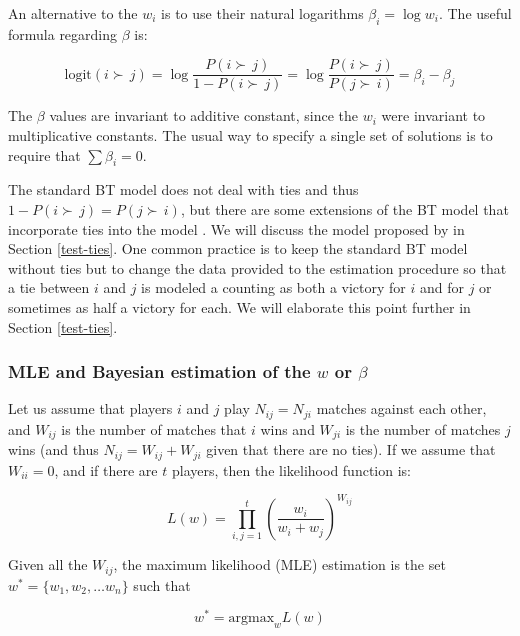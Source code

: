 \documentclass[twoside,11pt,preprint]{article}
\begin{document}
An alternative to the \(w_i\) is to use their natural logarithms \(\beta_i = \log w_i\).
The useful formula regarding \(\beta\) is:

\begin{equation*}
\mbox{logit}(i \succ\,j) = \log \frac{P(i \succ\,j)}{1-P(i \succ\,j)} = \log \frac{P(i \succ\,j)}{P(j \succ\,i)} = \beta_i - \beta_j 
\end{equation*}

The \(\beta\) values are invariant to additive constant, since the \(w_i\)
were invariant to multiplicative constants. The usual way to specify a
single set of solutions is to require that \(\sum \beta_i = 0\).

The standard BT model does not deal with ties and thus \(1 - P(i \succ\,j) = P(j \succ\,i)\), but there are some extensions of the BT
model that incorporate ties into the model \citep{rao1967ties, davidson1970extending, baker2021modifying}. We will discuss the model proposed by \citet{davidson1970extending} in Section \ref{test-ties}. One common practice
is to keep the standard BT model without ties but to change the data
provided to the estimation procedure so that a tie between \(i\) and \(j\)
is modeled a counting as both a victory for \(i\) and for \(j\) or sometimes
as half a victory for each. We will elaborate this point further
in Section \ref{test-ties}.

\hypertarget{mle-and-bayesian-estimation-of-the-w-or-beta}{%
\subsubsection{\texorpdfstring{MLE and Bayesian estimation of the \(w\) or \(\beta\) \label{sec:bayesbt}}{MLE and Bayesian estimation of the w or \textbackslash beta }}\label{mle-and-bayesian-estimation-of-the-w-or-beta}}

Let us assume that players \(i\) and \(j\) play \(N_{ij}= N_{ji}\) matches against each other,
and \(W_{ij}\) is the number of matches that \(i\) wins and \(W_{ji}\) is
the number of matches \(j\) wins (and thus \(N_{ij} = W_{ij} + W_{ji}\)
given that there are no ties). If we assume that \(W_{ii} = 0\), and if
there are \(t\) players, then the likelihood function is:

\[L(w) = \prod_{i,j=1}^t (\frac{w_i}{w_i+w_j } )^{W_{ij} }\]

Given all the \(W_{ij}\), the maximum likelihood (MLE) estimation is the set \(w^* = \{w_1, w_2, \ldots w_n \}\) such that

\[w^* = \mbox{argmax}_w L(w)\]
\end{document}
